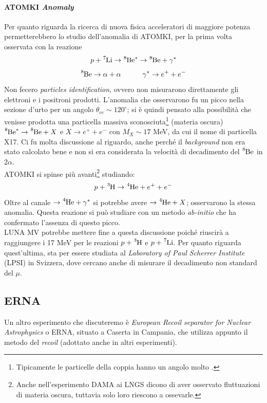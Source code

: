 \paragraph{ATOMKI \textit{Anomaly}} Per quanto riguarda la ricerca di nuova fisica acceleratori di maggiore potenza permetterebbero lo studio dell'anomalia di ATOMKI, per la prima volta osservata con la reazione
$$p+ \ce{^7Li} \to \ce{^8Be}^* \to \ce{^8Be} + \gamma^* $$
$$\ce{^8Be}\to \alpha + \alpha \qquad\quad \gamma^* \to e^+ + e^-$$
Non fecero \textit{particles identification}, ovvero non misurarono direttamente gli elettroni e i positroni prodotti. L'anomalia che osservarono fu un picco nella sezione d'urto per un angolo $\theta_{ee} \sim 120^{\circ}$; si è quindi pensato alla possibilità che venisse prodotta una particella massiva sconosciuta\footnote{Tipicamente le particelle della coppia hanno un angolo molto .} (materia oscura) $\ce{^8Be}^* \to \ce{^8Be} + X$ e $X\to e^+ + e^- $ con $M_X\sim 17$ MeV, da cui il nome di particella X17.
Ci fu molta discussione al riguardo, anche perché il \textit{background} non era stato calcolato bene e non si era considerata la velocità di decadimento del $\ce{^8Be}$ in $2\alpha$.\\
ATOMKI si spinse più avanti\footnote{Anche nell'esperimento DAMA ai LNGS dicono di aver osservato fluttuazioni di materia oscura, tuttavia solo loro riescono a ossevarle.} studiando:
$$p+\ce{^3H} \to \ce{^4He}+e^++e^-$$
Oltre al canale $\to \ce{^4He} +\gamma^*$ si potrebbe avere $\to \ce{^4He} + X$; osservarono la stessa anomalia. Questa reazione si può studiare con un metodo \textit{ab-initio} che ha confermato l'assenza di questo picco.\\
LUNA MV potrebbe mettere fine a questa discussione poiché riuscirà a raggiungere i 17 MeV per le reazioni $p+\ce{^3H}$ e $p+\ce{^7Li}$. Per quanto riguarda quest'ultima, sta per essere studiata al \textit{Laboratory of Paul Scherrer Institute} (LPSI) in Svizzera, dove cercano anche di misurare il decadimento non standard del $\mu$.

\subsection{ERNA}
Un altro esperimento che discuteremo è \textit{European Recoil separator for Nuclear Astrophysics} o ERNA, situato a Caserta in Campania, che utilizza appunto il metodo del \textit{recoil} (adottato anche in altri esperimenti).

